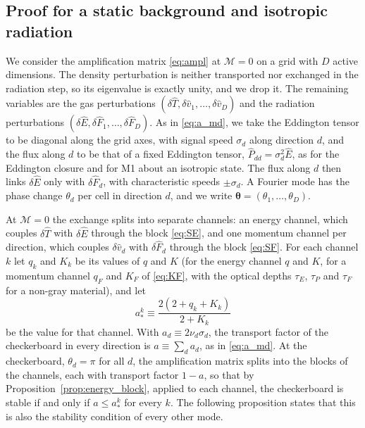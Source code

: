 \documentclass[preprint,12pt,authoryear]{elsarticle}
\newcommand{\hE}{\hat{E}}
\newcommand{\hv}{\hat{v}}
\newcommand{\hF}{\hat{F}}
\newcommand{\hT}{\hat{T}}
\newcommand{\calM}{\mathcal{M}}
\begin{document}
\begin{appendix}
\subsection{Proof for a static background and isotropic radiation}
\label{app:proof}

We consider the amplification matrix \autoref{eq:ampl} at $\calM = 0$ on a grid with $D$ active dimensions. The density perturbation is neither transported nor exchanged in the radiation step, so its eigenvalue is exactly unity, and we drop it. The remaining variables are the gas perturbations $(\delta\hT, \delta\hv_1, \ldots, \delta\hv_D)$ and the radiation perturbations $(\delta\hE, \delta\hF_1, \ldots, \delta\hF_D)$. As in \autoref{eq:a_md}, we take the Eddington tensor to be diagonal along the grid axes, with signal speed $\sigma_d$ along direction $d$, and the flux along $d$ to be that of a fixed Eddington tensor, $\hat{P}_{dd} = \sigma_d^2\hE$, as for the Eddington closure and for M1 about an isotropic state. The flux along $d$ then links $\delta\hE$ only with $\delta\hF_d$, with characteristic speeds $\pm\sigma_d$. A Fourier mode has the phase change $\theta_d$ per cell in direction $d$, and we write $\boldsymbol{\theta} = (\theta_1, \ldots, \theta_D)$.

At $\calM = 0$ the exchange splits into separate channels: an energy channel, which couples $\delta\hT$ with $\delta\hE$ through the block \autoref{eq:SE}, and one momentum channel per direction, which couples $\delta\hv_d$ with $\delta\hF_d$ through the block \autoref{eq:SF}. For each channel $k$ let $q_k$ and $K_k$ be its values of $q$ and $K$ (for the energy channel $q$ and $K$, for a momentum channel $q_F$ and $K_F$ of \autoref{eq:KF}, with the optical depths $\tau_E$, $\tau_P$ and $\tau_F$ for a non-gray material), and let
\begin{equation}
    a_*^k \equiv \frac{2\left(2 + q_k + K_k\right)}{2 + K_k}
    \label{eq:astar_channel}
\end{equation}
be the value for that channel. With $a_d \equiv 2\nu_d\sigma_d$, the transport factor of the checkerboard in every direction is $a \equiv \sum_d a_d$, as in \autoref{eq:a_md}. At the checkerboard, $\theta_d = \pi$ for all $d$, the amplification matrix splits into the blocks of the channels, each with transport factor $1 - a$, so that by Proposition~\ref{prop:energy_block}, applied to each channel, the checkerboard is stable if and only if $a \leq a_*^k$ for every $k$. The following proposition states that this is also the stability condition of every other mode.


\end{appendix}
\end{document}
